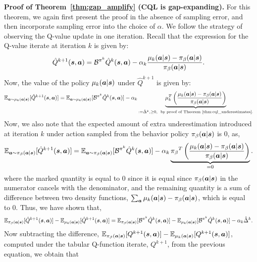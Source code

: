 \textbf{Proof of Theorem~\ref{thm:gap_amplify} (CQL is gap-expanding).} For this theorem, we again first present the proof in the absence of sampling error, and then incorporate sampling error into the choice of $\alpha$. We follow the strategy of observing the Q-value update in one iteration. Recall that the expression for the Q-value iterate at iteration $k$ is given by:
\begin{equation*}
    \hat{Q}^{k+1}(\boldsymbol{s}, \boldsymbol{a}) = \mathcal{B}^{\pi^k} \hat{Q}^{k}(\boldsymbol{s}, \boldsymbol{a}) - \alpha_k \frac{\mu_k(\boldsymbol{a}|\boldsymbol{s}) - {\pi_\beta}(\boldsymbol{a}|\boldsymbol{s})}{{\pi_\beta}(\boldsymbol{a}|\boldsymbol{s})}.
\end{equation*}
Now, the value of the policy $\mu_{k}(\boldsymbol{a}|\boldsymbol{s})$ under $\hat{Q}^{k+1}$ is given by:
\begin{equation*}
    \mathbb{E}_{\boldsymbol{a} \sim \mu_k(\boldsymbol{a}|\boldsymbol{s})}[\hat{Q}^{k+1}(\boldsymbol{s}, \boldsymbol{a})] = \mathbb{E}_{\boldsymbol{a} \sim \mu_k(\boldsymbol{a}|\boldsymbol{s})}[\mathcal{B}^{\pi^k} \hat{Q}^k (\boldsymbol{s}, \boldsymbol{a})] - \alpha_k \underbrace{\mu_k^T \left(\frac{\mu_k(\boldsymbol{a}|\boldsymbol{s}) - {\pi_\beta}(\boldsymbol{a}|\boldsymbol{s})}{{\pi_\beta}(\boldsymbol{a}|\boldsymbol{s})} \right)}_{:= \hat{\Delta}^k, \geq 0, \text{~~by proof of Theorem~\ref{thm:cql_underestimates}.}} 
\end{equation*}
Now, we also note that the expected amount of extra underestimation introduced at iteration $k$ under action sampled from the behavior policy ${\pi_\beta}(\boldsymbol{a}|\boldsymbol{s})$ is 0, as,
\begin{equation*}
    \mathbb{E}_{\boldsymbol{a} \sim {\pi_\beta}(\boldsymbol{a}|\boldsymbol{s})}[\hat{Q}^{k+1}(\boldsymbol{s}, \boldsymbol{a})] = \mathbb{E}_{\boldsymbol{a} \sim {\pi_\beta}(\boldsymbol{a}|\boldsymbol{s})}[\mathcal{B}^{\pi^k} \hat{Q}^k (\boldsymbol{s}, \boldsymbol{a})] - \alpha_k \underbrace{{\pi_\beta}^T \left(\frac{\mu_k(\boldsymbol{a}|\boldsymbol{s}) - {\pi_\beta}(\boldsymbol{a}|\boldsymbol{s})}{{\pi_\beta}(\boldsymbol{a}|\boldsymbol{s})} \right)}_{= 0}. 
\end{equation*}
where the marked quantity is equal to 0 since it is equal since ${\pi_\beta}(\boldsymbol{a}|\boldsymbol{s})$ in the numerator cancels with the denominator, and the remaining quantity is a sum of difference between two density functions, $\sum_{\boldsymbol{a}} \mu_k(\boldsymbol{a}|\boldsymbol{s}) - {\pi_\beta}(\boldsymbol{a}|\boldsymbol{s})$, which is equal to 0. Thus, we have shown that,
\begin{equation*}
    \mathbb{E}_{{\pi_\beta}(\boldsymbol{a}|\boldsymbol{s})}[\hat{Q}^{k+1}(\boldsymbol{s}, \boldsymbol{a})] - \mathbb{E}_{\mu_k(\boldsymbol{a}|\boldsymbol{s})}[\hat{Q}^{k+1}(\boldsymbol{s}, \boldsymbol{a})] = \mathbb{E}_{{\pi_\beta}(\boldsymbol{a}|\boldsymbol{s})}[\mathcal{B}^{\pi^k} \hat{Q}^k (\boldsymbol{s}, \boldsymbol{a})] - \mathbb{E}_{\mu_k(\boldsymbol{a}|\boldsymbol{s})}[\mathcal{B}^{\pi^k} \hat{Q}^k (\boldsymbol{s}, \boldsymbol{a})] - \alpha_k \hat{\Delta}^k.
\end{equation*}
Now subtracting the difference, $\mathbb{E}_{{\pi_\beta}(\boldsymbol{a}|\boldsymbol{s})}[Q^{k+1}(\boldsymbol{s}, \boldsymbol{a})] - \mathbb{E}_{\mu_k(\boldsymbol{a}|\boldsymbol{s})}[Q^{k+1}(\boldsymbol{s}, \boldsymbol{a})]$, computed under the tabular Q-function iterate, $Q^{k+1}$, from the previous equation, we obtain that
